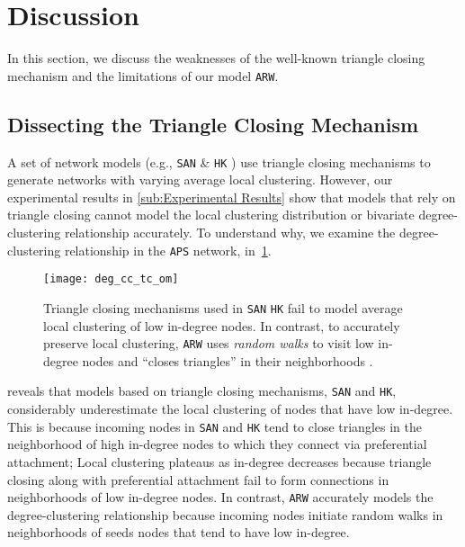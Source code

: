 
\section{Discussion}
\label{sec:Discussion}
In this section, we discuss the weaknesses of the well-known triangle closing mechanism
and the limitations of our model \texttt{ARW}.

\subsection{Dissecting the Triangle Closing Mechanism}
\label{ss:tc}

A set of network models (e.g., \texttt{SAN} \cite{gong2012evolution} \& \texttt{HK} \cite{holme2002growing})
use triangle closing mechanisms to generate networks with
varying average local clustering. However, our experimental results
in \cref{sub:Experimental Results} show that models that rely on triangle closing
cannot model the local clustering distribution or bivariate degree-clustering
relationship accurately. To understand why, we examine the degree-clustering
relationship in the \texttt{APS} network, in~\cref{fig:triangle_closing}.
\begin{figure}[h]
    \centering
    \vspace{-7pt}
    \texttt{[image: deg\_cc\_tc\_om]}
    \caption{Triangle closing mechanisms used in \texttt{SAN}  \texttt{HK} fail to
    model average local clustering of low in-degree nodes. In contrast,
    to accurately preserve local clustering, \texttt{ARW} uses \textit{random walks} to visit
    low in-degree nodes and ``closes triangles'' in their neighborhoods .}
    \label{fig:triangle_closing}
    \vspace{-5pt}
\end{figure}

 reveals that models based on triangle closing mechanisms,
\texttt{SAN} and \texttt{HK}, considerably underestimate the local clustering of
nodes that have low in-degree. This is because incoming nodes in \texttt{SAN} and \texttt{HK}
tend to close triangles in the neighborhood of high in-degree nodes to which they
connect via preferential attachment; Local clustering plateaus as in-degree decreases because
triangle closing along with preferential attachment fail to form connections in neighborhoods
of low in-degree nodes. In contrast, \texttt{ARW} accurately models the degree-clustering relationship
because incoming nodes initiate random walks in neighborhoods of seeds nodes that tend to have
low in-degree.

